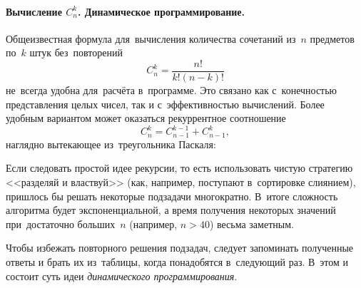 \paragraph{Вычисление \(C_n^k\). Динамическое программирование.}
Общеизвестная формула для~вычисления количества сочетаний из~\(n\) предметов по~\(k\) штук без~повторений
\[
C_n^k = \frac{n!}{k! (n-k)!}
\]
не~всегда удобна для~расчёта в~программе. Это связано как с~конечностью представления целых чисел, так и с~эффективностью вычислений. Более удобным вариантом может оказаться рекуррентное соотношение
\[
C_n^k = C_{n-1}^{k-1} + C_{n-1}^k,
\]
наглядно вытекающее из~треугольника Паскаля:
\begin{center}
\end{center}

Если следовать простой идее рекурсии, то есть использовать чистую стратегию <<разделяй и властвуй>> (как, например, поступают в~сортировке слиянием), пришлось бы решать некоторые подзадачи многократно. В~итоге сложность алгоритма будет экспоненциальной, а время получения некоторых значений при~достаточно больших~\(n\) (например, \(n > 40\)) весьма заметным.

Чтобы избежать повторного решения подзадач, следует запоминать полученные ответы и брать их из~таблицы, когда понадобятся в~следующий раз. В~этом и состоит суть идеи \emph{динамического программирования}.



